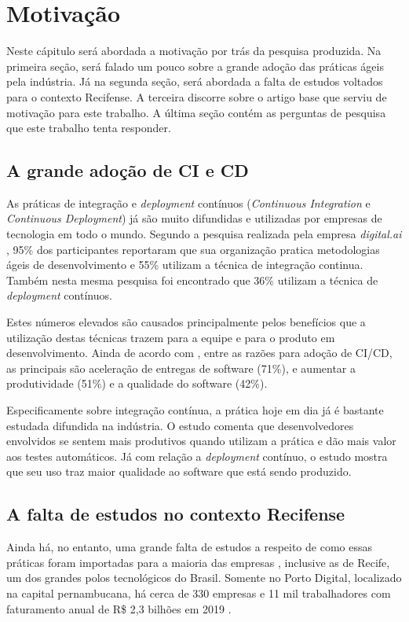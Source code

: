 
\chapter{Motivação}
Neste cápitulo será abordada a motivação por trás da pesquisa produzida. Na primeira seção, será falado um pouco sobre a grande adoção das práticas ágeis pela indústria. Já na segunda seção, será abordada a falta de estudos voltados para o contexto Recifense. A terceira discorre sobre o artigo base que serviu de motivação para este trabalho. A última seção contém as perguntas de pesquisa que este trabalho tenta responder.

\section{A grande adoção de CI e CD}
As práticas de integração e \emph{deployment} contínuos (\emph{Continuous Integration} e \emph{Continuous Deployment}) já são muito difundidas e utilizadas por empresas de tecnologia em todo o mundo. Segundo a pesquisa realizada pela empresa \emph{digital.ai} \cite{stateAgileReport2020}, 95\% dos participantes reportaram que sua organização pratica metodologias ágeis de desenvolvimento e 55\% utilizam a técnica de integração continua. Também nesta mesma pesquisa foi encontrado que 36\% utilizam a técnica de \emph{deployment} contínuos. 

Estes números elevados são causados principalmente pelos benefícios que a utilização destas técnicas trazem para a equipe e para o produto em desenvolvimento. Ainda de acordo com \cite{stateAgileReport2020}, entre as razões para adoção de CI/CD, as principais são aceleração de entregas de software (71\%), e aumentar a produtividade (51\%) e a qualidade do software (42\%). 

Especificamente sobre integração contínua, a prática hoje em dia já é bastante estudada difundida na indústria. O estudo \cite{hilton2016} comenta que desenvolvedores envolvidos se sentem mais produtivos quando utilizam a prática e dão mais valor aos testes automáticos.  Já com relação a \emph{deployment} contínuo, o estudo \cite{savor2015} mostra que seu uso traz maior qualidade ao software que está sendo produzido. 

\section{A falta de estudos no contexto Recifense}

Ainda há, no entanto, uma grande falta de estudos a respeito de como essas práticas foram importadas para a maioria das empresas \cite{empiricalStudy2016}, inclusive as de Recife, um dos grandes polos tecnológicos do Brasil. Somente no Porto Digital, localizado na capital pernambucana, há cerca de 330 empresas e 11 mil trabalhadores com faturamento anual de R\$ 2,3 bilhões em 2019 \cite{portoDigital}.

